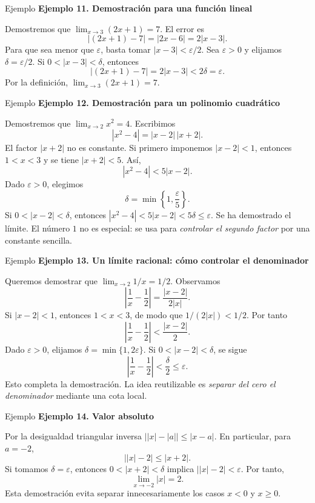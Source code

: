\documentclass[12pt,aspectratio=169]{beamer}
\begin{document}
\begin{frame}[t,allowframebreaks]{Ejemplo}
{\color{azul}\bfseries Ejemplo 11. Demostración para una función lineal}\par\medskip

Demostremos que $\lim_{x\to3}(2x+1)=7$. El error es
\[
 |(2x+1)-7|=|2x-6|=2|x-3|.
\]
Para que sea menor que $\varepsilon$, basta tomar $|x-3|<\varepsilon/2$. Sea $\varepsilon>0$ y elijamos $\delta=\varepsilon/2$. Si $0<|x-3|<\delta$, entonces
\[
 |(2x+1)-7|=2|x-3|<2\delta=\varepsilon.
\]
Por la definición, $\boxed{\lim_{x\to3}(2x+1)=7}$.
\end{frame}


\begin{frame}[t,allowframebreaks]{Ejemplo}
{\color{azul}\bfseries Ejemplo 12. Demostración para un polinomio cuadrático}\par\medskip

Demostremos que $\lim_{x\to2}x^2=4$. Escribimos
\[
 |x^2-4|=|x-2|\,|x+2|.
\]
El factor $|x+2|$ no es constante. Si primero imponemos $|x-2|<1$, entonces $1<x<3$ y se tiene $|x+2|<5$. Así,
\[
 |x^2-4|<5|x-2|.
\]
Dado $\varepsilon>0$, elegimos
\[
 \boxed{\delta=\min\left\{1,\frac{\varepsilon}{5}\right\}.}
\]
Si $0<|x-2|<\delta$, entonces $|x^2-4|<5|x-2|<5\delta\le\varepsilon$. Se ha demostrado el límite. El número $1$ no es especial: se usa para \emph{controlar el segundo factor} por una constante sencilla.
\end{frame}


\begin{frame}[t,allowframebreaks]{Ejemplo}
{\color{azul}\bfseries Ejemplo 13. Un límite racional: cómo controlar el denominador}\par\medskip

Queremos demostrar que $\lim_{x\to2}1/x=1/2$. Observamos
\[
 \left|\frac1x-\frac12\right|=\frac{|x-2|}{2|x|}.
\]
Si $|x-2|<1$, entonces $1<x<3$, de modo que $1/(2|x|)<1/2$. Por tanto
\[
 \left|\frac1x-\frac12\right|<\frac{|x-2|}{2}.
\]
Dado $\varepsilon>0$, elijamos $\delta=\min\{1,2\varepsilon\}$. Si $0<|x-2|<\delta$, se sigue
\[
 \left|\frac1x-\frac12\right|<\frac{\delta}{2}\le\varepsilon.
\]
Esto completa la demostración. La idea reutilizable es \emph{separar del cero el denominador} mediante una cota local.
\end{frame}


\begin{frame}[t,allowframebreaks]{Ejemplo}
{\color{azul}\bfseries Ejemplo 14. Valor absoluto}\par\medskip

Por la desigualdad triangular inversa $\bigl||x|-|a|\bigr|\le|x-a|$. En particular, para $a=-2$,
\[
 \bigl||x|-2\bigr|\le|x+2|.
\]
Si tomamos $\delta=\varepsilon$, entonces $0<|x+2|<\delta$ implica $\bigl||x|-2\bigr|<\varepsilon$. Por tanto,
\[
 \boxed{\lim_{x\to-2}|x|=2}.
\]
Esta demostración evita separar innecesariamente los casos $x<0$ y $x\ge0$.
\end{frame}
\end{document}
